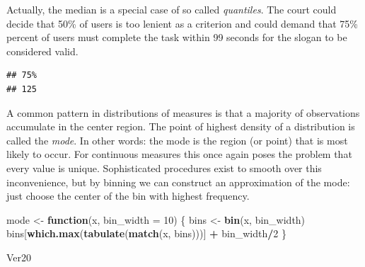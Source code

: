 \documentclass[]{svmono}
\newenvironment{Shaded}{\begin{snugshade}}{\end{snugshade}}
\newcommand{\KeywordTok}[1]{\textcolor[rgb]{0.13,0.29,0.53}{\textbf{#1}}}
\newcommand{\DataTypeTok}[1]{\textcolor[rgb]{0.13,0.29,0.53}{#1}}
\newcommand{\DecValTok}[1]{\textcolor[rgb]{0.00,0.00,0.81}{#1}}
\newcommand{\StringTok}[1]{\textcolor[rgb]{0.31,0.60,0.02}{#1}}
\newcommand{\ControlFlowTok}[1]{\textcolor[rgb]{0.13,0.29,0.53}{\textbf{#1}}}
\newcommand{\OperatorTok}[1]{\textcolor[rgb]{0.81,0.36,0.00}{\textbf{#1}}}
\newcommand{\NormalTok}[1]{#1}
\begin{document}
Actually, the median is a special case of so called \emph{quantiles}.
The court could decide that 50\% of users is too lenient as a criterion
and could demand that 75\% percent of users must complete the task
within 99 seconds for the slogan to be considered valid.

\begin{Shaded}
\end{Shaded}

\begin{verbatim}
## 75% 
## 125
\end{verbatim}

A common pattern in distributions of measures is that a majority of
observations accumulate in the center region. The point of highest
density of a distribution is called the \emph{mode}. In other words: the
mode is the region (or point) that is most likely to occur. For
continuous measures this once again poses the problem that every value
is unique. Sophisticated procedures exist to smooth over this
inconvenience, but by binning we can construct an approximation of the
mode: just choose the center of the bin with highest frequency.

\begin{Shaded}
\begin{Highlighting}[]
\NormalTok{mode <-}\StringTok{ }\ControlFlowTok{function}\NormalTok{(x, }\DataTypeTok{bin_width =} \DecValTok{10}\NormalTok{) \{}
\NormalTok{  bins <-}\StringTok{ }\KeywordTok{bin}\NormalTok{(x, bin_width)}
\NormalTok{  bins[}\KeywordTok{which.max}\NormalTok{(}\KeywordTok{tabulate}\NormalTok{(}\KeywordTok{match}\NormalTok{(x, bins)))] }\OperatorTok{+}\StringTok{ }\NormalTok{bin_width}\OperatorTok{/}\DecValTok{2}
\NormalTok{\}}
\end{Highlighting}
\end{Shaded}

\begin{Shaded}
\begin{Highlighting}[]
\NormalTok{Ver20}
\end{Highlighting}
\end{Shaded}
\end{document}
